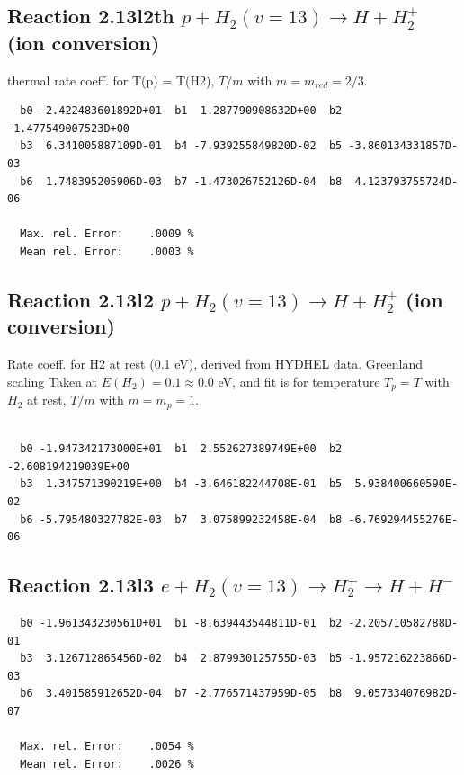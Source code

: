 \documentclass[12pt,dvipdfmx]{article}
\begin{document}
\subsection{
Reaction 2.13l2th
$ p + H_2(v=13) \rightarrow H + H_2^+$ (ion conversion)
}
thermal rate coeff. for T(p) = T(H2),
$T/m$ with $m=m_{red}=2/3$.

\begin{small}\begin{verbatim}
  b0 -2.422483601892D+01  b1  1.287790908632D+00  b2 -1.477549007523D+00
  b3  6.341005887109D-01  b4 -7.939255849820D-02  b5 -3.860134331857D-03
  b6  1.748395205906D-03  b7 -1.473026752126D-04  b8  4.123793755724D-06

  Max. rel. Error:    .0009 %
  Mean rel. Error:    .0003 %
\end{verbatim}\end{small}

\subsection{
Reaction 2.13l2
$ p + H_2(v=13) \rightarrow H + H_2^+$ (ion conversion)
}
Rate coeff. for H2 at rest (0.1 eV), derived from HYDHEL data. Greenland scaling
Taken at $E(H_2) = 0.1 \approx 0.0$ eV,  and fit is for temperature $T_p=T$ with $H_2$ at rest,
$T/m$ with $m=m_p=1$.

\begin{small}\begin{verbatim}

  b0 -1.947342173000E+01  b1  2.552627389749E+00  b2 -2.608194219039E+00
  b3  1.347571390219E+00  b4 -3.646182244708E-01  b5  5.938400660590E-02
  b6 -5.795480327782E-03  b7  3.075899232458E-04  b8 -6.769294455276E-06

\end{verbatim}\end{small}

\newpage

\subsection{
Reaction 2.13l3
 $ e + H_2(v=13) \rightarrow H_2^- \rightarrow H + H^-$
}


\begin{small}\begin{verbatim}
  b0 -1.961343230561D+01  b1 -8.639443544811D-01  b2 -2.205710582788D-01
  b3  3.126712865456D-02  b4  2.879930125755D-03  b5 -1.957216223866D-03
  b6  3.401585912652D-04  b7 -2.776571437959D-05  b8  9.057334076982D-07

  Max. rel. Error:    .0054 %
  Mean rel. Error:    .0026 %
\end{verbatim}\end{small}
\end{document}
